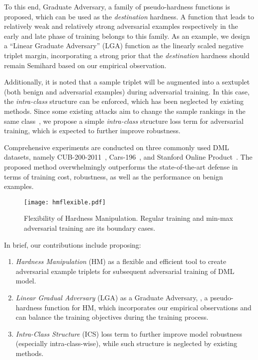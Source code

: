 \documentclass[10pt,twocolumn,letterpaper]{article}
\begin{document}

To this end, Graduate Adversary, a family of pseudo-hardness functions is
proposed, which can be used as the \emph{destination} hardness.
%
A function that leads to relatively weak and relatively strong adversarial
examples respectively in the early and late phase of training belongs to this
family.
%
As an example, we design a ``Linear Graduate Adversary'' (LGA)
function as the linearly scaled negative triplet margin, incorporating a strong
prior that the \emph{destination} hardness should remain Semihard
based on our empirical observation.


Additionally, it is noted that a sample triplet will be augmented into a
sextuplet (both benign and adversarial examples) during adversarial training.
%
In this case, the \emph{intra-class} structure can be enforced, which has been
neglected by existing methods.
%
Since some existing attacks aim to change the sample rankings in the same
class~\cite{advrank},
%
we propose a simple \emph{intra-class} structure loss term for adversarial
training, which is expected to further improve robustness.

Comprehensive experiments are conducted on three commonly used DML datasets,
namely CUB-200-2011~\cite{cub200}, Cars-196~\cite{cars196}, and Stanford Online
Product~\cite{sop}.
%
The proposed method overwhelmingly outperforms the state-of-the-art defense in
terms of training cost, robustness, as well as the performance on benign
examples.

\begin{figure}
	\texttt{[image: hmflexible.pdf]}
	\vspace{-1.8em}
	\caption{Flexibility of Hardness Manipulation.
	Regular training and min-max adversarial training are its boundary cases.
	}
	\label{fig:hmflexible}
\end{figure}

In brief, our contributions include proposing:
%
\begin{enumerate}[nosep, noitemsep, leftmargin=*]
	\item {\textit{Hardness Manipulation}} (HM) as a flexible and efficient
		tool to create adversarial example triplets for subsequent adversarial
		training of DML model.
	\item \textit{Linear Gradual Adversary} (LGA) as a Graduate Adversary, \ie,
		a pseudo-hardness function for HM, which incorporates our empirical
		observations and can balance the training objectives during the
		training process.
	\item \textit{Intra-Class Structure} (ICS) loss term to further improve
		model robustness (especially intra-class-wise), while such structure is
		neglected by existing methods. 
\end{enumerate}
\end{document}
